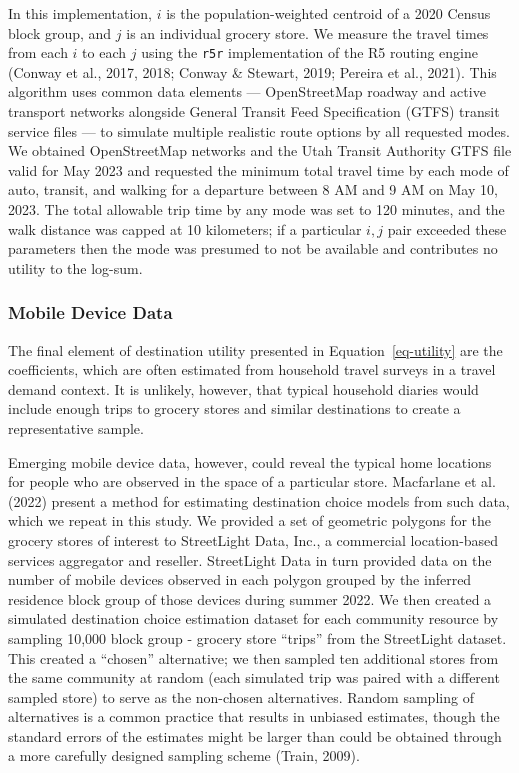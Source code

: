 \documentclass[
  letterpaper,
  authoryear,
  review,
  3p]{elsarticle}
\begin{document}
In this implementation, \(i\) is the population-weighted centroid of a
2020 Census block group, and \(j\) is an individual grocery store. We
measure the travel times from each \(i\) to each \(j\) using the
\texttt{r5r} implementation of the R5 routing engine (Conway et al.,
2017, 2018; Conway \& Stewart, 2019; Pereira et al., 2021). This
algorithm uses common data elements --- OpenStreetMap roadway and active
transport networks alongside General Transit Feed Specification (GTFS)
transit service files --- to simulate multiple realistic route options
by all requested modes. We obtained OpenStreetMap networks and the Utah
Transit Authority GTFS file valid for May 2023 and requested the minimum
total travel time by each mode of auto, transit, and walking for a
departure between 8 AM and 9 AM on May 10, 2023. The total allowable
trip time by any mode was set to 120 minutes, and the walk distance was
capped at 10 kilometers; if a particular \(i,j\) pair exceeded these
parameters then the mode was presumed to not be available and
contributes no utility to the log-sum.

\hypertarget{mobile-device-data}{%
\subsubsection{Mobile Device Data}\label{mobile-device-data}}

The final element of destination utility presented in
Equation~\ref{eq-utility} are the coefficients, which are often
estimated from household travel surveys in a travel demand context. It
is unlikely, however, that typical household diaries would include
enough trips to grocery stores and similar destinations to create a
representative sample.

Emerging mobile device data, however, could reveal the typical home
locations for people who are observed in the space of a particular
store. Macfarlane et al. (2022) present a method for estimating
destination choice models from such data, which we repeat in this study.
We provided a set of geometric polygons for the grocery stores of
interest to StreetLight Data, Inc., a commercial location-based services
aggregator and reseller. StreetLight Data in turn provided data on the
number of mobile devices observed in each polygon grouped by the
inferred residence block group of those devices during summer 2022. We
then created a simulated destination choice estimation dataset for each
community resource by sampling 10,000 block group - grocery store
``trips'' from the StreetLight dataset. This created a ``chosen''
alternative; we then sampled ten additional stores from the same
community at random (each simulated trip was paired with a different
sampled store) to serve as the non-chosen alternatives. Random sampling
of alternatives is a common practice that results in unbiased estimates,
though the standard errors of the estimates might be larger than could
be obtained through a more carefully designed sampling scheme (Train,
2009).
\end{document}
